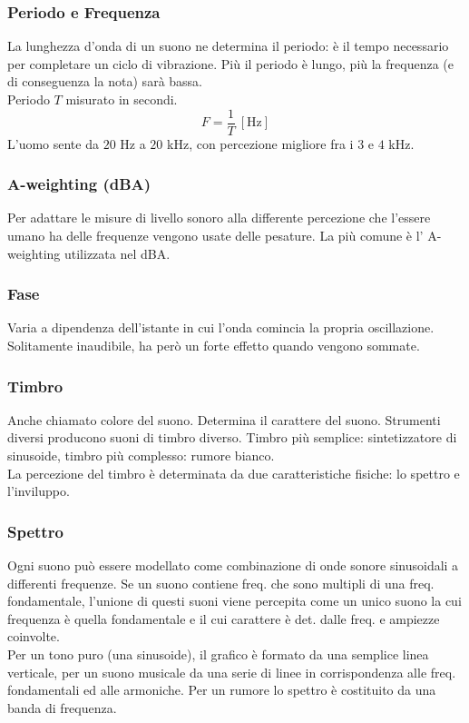 \documentclass[8pt,a4paper]{article}
\begin{document}
\begin{multicols}{5}
    \subsubsection{Periodo e Frequenza}
    La lunghezza d'onda di un suono ne determina il periodo: è il tempo
    necessario per completare un ciclo di vibrazione. Più il periodo è lungo, più la
    frequenza (e di conseguenza la nota) sarà bassa. \\
    Periodo $T$ misurato in secondi.
    \begin{equation*}
      F = \frac{1}{T}\ [\text{Hz}]
    \end{equation*}
    \noindent
    L'uomo sente da $20$ Hz a $20$ kHz, con percezione migliore fra i $3$ e $4$ kHz.

    \subsubsection{A-weighting (dBA)}
    Per adattare le misure di livello sonoro alla differente percezione che l’essere
    umano ha delle frequenze vengono usate delle pesature. La più comune è l’
    A-weighting utilizzata nel dBA.

    \subsubsection{Fase}
    Varia a dipendenza dell'istante in cui l'onda comincia la propria oscillazione.
    Solitamente inaudibile, ha però un forte effetto quando vengono sommate.

    \subsubsection{Timbro}
    \noindent
    Anche chiamato colore del suono. Determina il carattere del suono. Strumenti
    diversi producono suoni di timbro diverso. Timbro più semplice: sintetizzatore 
    di sinusoide, timbro più complesso: rumore bianco. \\
    La percezione del timbro è determinata da due caratteristiche fisiche: lo spettro 
    e l’inviluppo.

    \subsubsection{Spettro}
    Ogni suono può essere modellato come combinazione di onde sonore sinusoidali a
    differenti frequenze. Se un suono contiene freq. che sono multipli di una freq.
    fondamentale, l'unione di questi suoni viene percepita come un unico suono
    la cui frequenza è quella fondamentale e il cui carattere è det. dalle freq.
    e ampiezze coinvolte. \\
    Per un tono puro (una sinusoide), il grafico è formato da una semplice linea 
    verticale, per un suono musicale da una serie di linee in corrispondenza alle 
    freq. fondamentali ed alle armoniche. Per un rumore lo spettro è costituito da una
    banda di frequenza.
    

\end{multicols}
\end{document}
